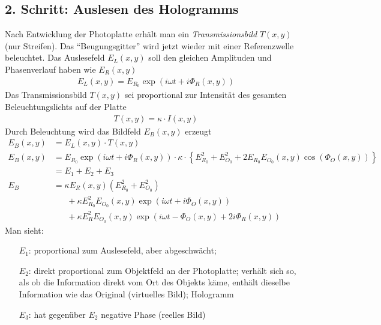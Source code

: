 \subsection*{2. Schritt: Auslesen des Hologramms}
Nach Entwicklung der Photoplatte erhält man ein
\emph{Transmissionsbild} $T(x,y)$%
(nur Streifen).
Das \enquote{Beugungsgitter} wird jetzt wieder mit einer Referenzwelle
beleuchtet.
Das Auslesefeld $E_L(x,y)$%
soll den gleichen Amplituden und Phasenverlauf haben wie $E_R(x,y)$
\begin{gather*}
  E_L(x,y) = E_{R_0}\exp(i\omega t + i\Phi_R(x,y))
\end{gather*}
Das Transmissionsbild $T(x,y)$ sei proportional zur Intensität des
gesamten Beleuchtungslichts auf der Platte
\begin{gather*}
  T(x,y) = \kappa \cdot I(x,y)
\end{gather*}
Durch Beleuchtung wird das Bildfeld $E_B(x,y)$ 
erzeugt
\begin{align*}
  E_B(x,y) &= E_L(x,y) \cdot T(x,y)\\
  E_B(x,y) &= E_{R_0}\exp(i\omega t + i\Phi_R(x,y))\cdot \kappa 
             \cdot\left\{E_{R_0}^2 + E_{O_0}^2 +
             2E_{R_0}E_{O_0}(x,y)\cos(\Phi_O(x,y))\right\}\\
           &= E_1 + E_2 + E_3\\
  E_B &= \kappa E_R(x,y) \left( E_{R_0}^2 + E_{O_0}^2 \right)\\
           &\phantom{=}\; + 
             \kappa E_{R_0}^2 E_{O_0}(x,y)\exp(i\omega t + i\Phi_O(x,y))\\
           &\phantom{=}\; + 
             \kappa E_{R}^2 E_{O_0}(x,y)\exp(i\omega t-\Phi_O(x,y)+2i\Phi_R(x,y))
\end{align*}
Man sieht:
\begin{itemize}
\item[$E_1$:] proportional zum Auslesefeld, aber abgeschwächt;
\item[$E_2$:] direkt proportional zum Objektfeld an der Photoplatte;
  verhält sich so, als ob die Information direkt vom Ort des Objekts
  käme, enthält dieselbe Information wie das Original (virtuelles
  Bild); Hologramm
\item[$E_3$:] hat gegenüber $E_2$ negative Phase (reelles Bild)
\end{itemize}


